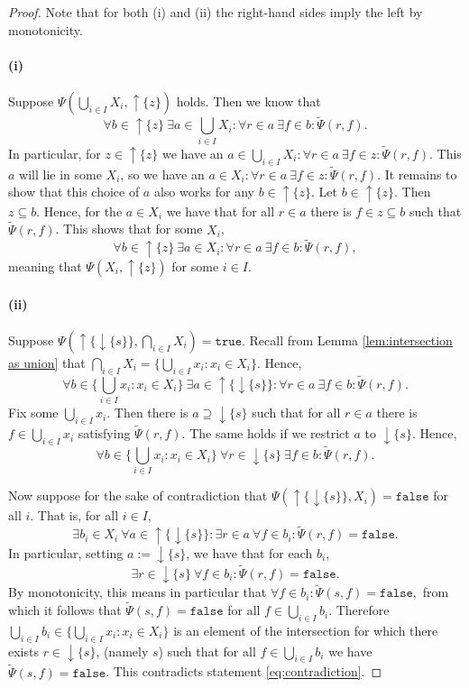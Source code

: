 \documentclass[12pt]{article}
\theoremstyle{definition}
\theoremstyle{plain}
\theoremstyle{plain}
\theoremstyle{plain}
\theoremstyle{plain}
\theoremstyle{remark}
\theoremstyle{remark}
\newcommand{\sub}{\subseteq}
\newcommand{\true}{\mathtt{true}}
\newcommand{\false}{\mathtt{false}}
\newcommand{\upc}[1]{{\uparrow #1}}
\newcommand{\lwc}[1]{{\downarrow #1}}
\begin{document}
\begin{proof}
	Note that for both (i) and (ii) the right-hand sides imply the left by monotonicity. 
	
	\paragraph{(i)} Suppose  $\Psi(\bigcup_{i \in I} X_i, \upc{\{z\}})$ holds. Then we know that
	$$\forall b \in \upc{\{z\}} \: \exists a \in \bigcup_{i \in I} X_i: \forall r \in a \: \exists f \in b: \tilde\Psi(r,f).$$
	In particular, for $z \in \upc\{z\}$ we have an $a \in \bigcup_{i \in I} X_i: \forall r \in a \: \exists f \in z: \tilde\Psi(r,f).$ This $a$ will lie in some $X_i$, so we have an $a \in X_i: \forall r \in a \: \exists f \in z: \tilde\Psi(r,f).$ It remains to show that this choice of $a$ also works for any $b \in \upc{\{z\}}$. Let $b \in \upc{\{z\}}$. Then $z \sub b$. Hence, for the $a \in X_i$ we have that for all $r \in a$ there is $f \in z \sub b$ such that $\tilde\Psi(r,f)$. This shows that for some $X_i$,
	$$\forall b \in \upc{\{z\}} \: \exists a \in X_i: \forall r \in a \: \exists f \in b: \tilde\Psi(r,f),$$
	meaning that $\Psi(X_i,\upc{\{z\}})$ for some $i \in I$.
	
	\paragraph{(ii)} Suppose $\Psi(\upc{\{\lwc{\{s\}}\}}, \bigcap_{i \in I}X_i) = \true$. Recall from Lemma \ref{lem:intersection as union} that $\bigcap_{i \in I}X_i = \{\bigcup_{i \in I} x_i : x_i  \in X_i \}$. Hence,
	$$\forall b \in \{ \bigcup_{i \in I} x_i : x_i \in X_i \}\: \exists a \in \upc{\{\lwc{\{s\}}\}}: \forall r \in a \: \exists f \in b: \tilde\Psi(r,f).$$
	Fix some $\bigcup_{i \in I} x_i$. Then there is $a \supseteq \lwc{\{s\}}$ such that for all $r \in a$ there is $f \in \bigcup_{i \in I} x_i$ satisfying $ \tilde\Psi(r,f)$. The same holds if we restrict $a$ to $\lwc{\{s\}}$. Hence,
	\begin{equation}\label{eq:contradiction}
		\forall b \in \{ \bigcup_{i \in I} x_i : x_i \in X_i \}\: \forall r \in \lwc{\{s\}} \: \exists f \in b: \tilde\Psi(r,f).
	\end{equation}
	
	Now suppose for the sake of contradiction that $\Psi(\upc{\{\lwc{\{s\}}\}},X_i) = \false$ for all $i$. That is, for all $i \in I$,
	$$\exists b_i \in X_i \: \forall a \in \upc{\{\lwc{\{s\}}\}}: \exists r \in a \: \forall f \in b_i: \tilde\Psi(r,f) = \false.$$
	In particular, setting $a := \lwc\{s\}$, we have that for each $b_i$,
	$$\exists r \in \lwc{\{s\}} \: \forall f \in b_i: \tilde\Psi(r,f) = \false.$$
	By monotonicity, this means in particular that $\forall f \in b_i: \tilde\Psi(s,f) = \false,$
	from which it follows that $\tilde\Psi(s,f) = \false$ for all $f \in \bigcup_{i \in I} b_i$.
	Therefore $\bigcup_{i \in I} b_i \in \{ \bigcup_{i \in I} x_i : x_i \in X_i \}$ is an element of the intersection for which there exists $r \in \lwc{\{s\}}$, (namely $s$) such that for all $f \in \bigcup_{i \in I} b_i$ we have $\tilde\Psi(s,f) = \false$. This contradicts statement \eqref{eq:contradiction}.
\end{proof}
\end{document}
